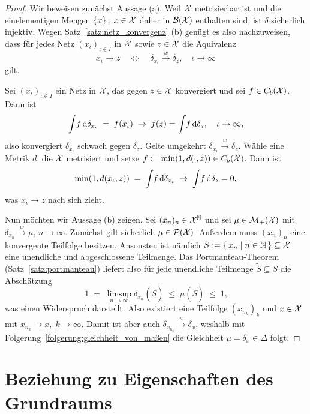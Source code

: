 \documentclass[../thesis/thesis.tex]{subfiles}
\begin{document}
	\begin{proof}
		Wir beweisen zunächst Aussage (a). Weil $\mathcal{X}$ metrisierbar ist und die einelementigen Mengen $\left\{x\right\}, \; x \in \mathcal{X}$ daher in $\mathcal{B}(\mathcal{X})$ enthalten sind, ist $\delta$ sicherlich injektiv.
		Wegen Satz~\ref{satz:netz_konvergenz} (b) genügt es also nachzuweisen, dass für jedes Netz $(x_\iota)_{\iota \in I}$ in $\mathcal{X}$ sowie $z \in \mathcal{X}$ die Äquivalenz
		\[ x_\iota \to z \quad \iff \quad \delta_{x_\iota} \xrightarrow{w} \delta_z, \quad \iota \to \infty \]
		gilt. 
		
		Sei  $(x_\iota)_{\iota \in I}$ ein Netz in $\mathcal{X}$, das gegen $z \in \mathcal{X}$ konvergiert und sei $f \in C_b(\mathcal{X})$. Dann ist
		\[ \int_{} \, f \, \mathrm{d}\delta_{x_\iota} \; = \; f(x_\iota) \; \to \; f(z) = \int_{} \, f \, \mathrm{d}\delta_{z}, \quad \iota \to \infty \text{,} \]
		also konvergiert $\delta_{x_\iota}$ schwach gegen $\delta_z$. Gelte umgekehrt $\delta_{x_\iota} \xrightarrow{w} \delta_z$. Wähle eine Metrik $d$, die $\mathcal{X}$ metrisiert und
		setze $f \vcentcolon = \min (1, d(\cdot, z)) \in C_b(\mathcal{X})$. Dann ist 
		\[ \min (1, d(x_\iota, z)) \; = \; \int_{} \, f \, \mathrm{d}\delta_{x_\iota} \; \to \; \int_{} \, f \, \mathrm{d}\delta_{z} = 0 \text{,} \]
		was $x_\iota \to z$ nach sich zieht.
		
		Nun möchten wir Aussage (b) zeigen. Sei $(x_n)_n \in \mathcal{X}^{\mathbb{N}}$ und sei $\mu \in \mathcal{M}_{+}(\mathcal{X})$ mit $\delta_{x_n} \xrightarrow{w} \mu$, $n \to \infty$. Zunächst gilt sicherlich $\mu \in \mathcal{P}(\mathcal{X})$.
		Außerdem muss $(x_n)_n$ eine konvergente Teilfolge besitzen. Ansonsten ist nämlich $S \vcentcolon = \left\{\, x_n \; \middle| \; n \in \mathbb{N} \,\right\} \subseteq \mathcal{X}$ eine unendliche und abgeschlossene Teilmenge. Das Portmanteau-Theorem (Satz~\ref{satz:portmanteau}) liefert also für jede unendliche Teilmenge $\tilde{S} \subseteq S$ die Abschätzung
		\[ 1 \; = \; \limsup_{n \to \infty} \delta_{x_n}(\tilde{S}) \; \leq \; \mu(\tilde{S}) \; \leq \; 1 \text{,} \]
		was einen Widerspruch darstellt. Also existiert eine Teilfolge $(x_{n_k})_k$ und $x \in \mathcal{X}$ mit $x_{n_k} \to x, \; k \to \infty$. Damit ist aber auch $\delta_{x_{n_k}} \xrightarrow{w} \delta_x$, weshalb mit
		Folgerung~\ref{folgerung:gleichheit_von_maßen} die Gleichheit $\mu = \delta_x \in \Delta$ folgt.
	\end{proof}

	\section{Beziehung zu Eigenschaften des Grundraums}
	\label{subsec:beziehung_zu_eigenschaften_des_grundraums}
	
\end{document}
